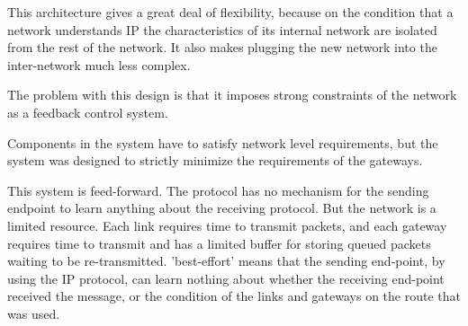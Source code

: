This architecture gives a great deal of flexibility, because on the condition that a network
understands IP the characteristics of its internal network are isolated from the rest of the
network. It also makes plugging the new network into the inter-network much less complex.

The problem with this design is that it imposes strong constraints of the network as a feedback
control system.

Components in the system have to satisfy network level requirements, but the system was designed to
strictly minimize the requirements of the gateways.







This system is feed-forward. The protocol has no mechanism for the sending endpoint to learn
anything about the receiving protocol. But the network is a limited resource. Each link requires
time to transmit packets, and each gateway requires time to transmit and has a limited buffer for
storing queued packets waiting to be re-transmitted. 'best-effort' means that the sending end-point,
by using the IP protocol, can learn nothing about whether the receiving end-point received the
message, or the condition of the links and gateways on the route that was used. 

